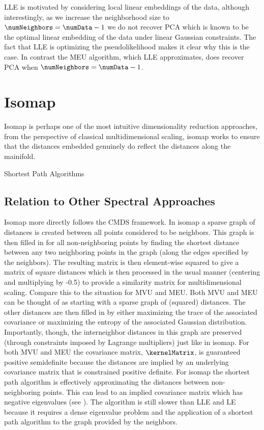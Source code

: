 LLE is motivated by considering local linear embeddings of the data,
although interestingly, as we increase the neighborhood size to
$\numNeighbors = \numData-1$ 
we do not recover PCA which is known to be the optimal linear
embedding of the data under linear Gaussian constraints. The fact that
LLE is optimizing the pseudolikelihood makes it clear why this is the
case. In contrast the MEU algorithm, which LLE approximates, does recover
PCA when $\numNeighbors = \numData-1$.

\section{Isomap}

Isomap is perhaps one of the most intuitive dimensionality reduction approaches, from the perspective of classical multidimensional scaling, isomap works to ensure that the distances embedded genuinely do reflect the distances along the mainifold.

\begin{boxfloat}
\caption{Shortest Path Algorithms}\label{box:shortestPath}
\end{boxfloat}


\subsection{Relation to Other Spectral Approaches}

Isomap more directly follows the CMDS framework. In isomap
\citep{Tenenbaum:isomap00} a sparse graph of distances is created
between all points considered to be neighbors. This graph is then
filled in for all non-neighboring points by finding the shortest
distance between any two neighboring points in the graph (along the
edges specified by the neighbors). The resulting matrix is then
element-wise squared to give a matrix of square distances which is
then processed in the usual manner (centering and multiplying by -0.5)
to provide a similarity matrix for multidimensional scaling. Compare
this to the situation for MVU and MEU. Both MVU and MEU can be thought
of as starting with a sparse graph of (squared) distances. The other
distances are then filled in by either maximizing the trace of the
associated covariance or maximizing the entropy of the associated
Gaussian distribution. Importantly, though, the interneighbor
distances in this graph are preserved (through constraints imposed by
Lagrange multipliers) just like in isomap. For both MVU and MEU the
covariance matrix, $\kernelMatrix$, is guaranteed positive
semidefinite because the distances are implied by an underlying
covariance matrix that is constrained positive definite. For isomap
the shortest path algorithm is effectively approximating the distances
between non-neighboring points. This can lead to an implied covariance
matrix which has negative eigenvalues (see
\citep{Weinberger:learning04}).  The algorithm is still slower than
LLE and LE because it requires a dense eigenvalue problem and the
application of a shortest path algorithm to the graph provided by the
neighbors.


